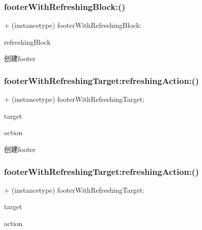 \subsubsection{\texorpdfstring{footer\+With\+Refreshing\+Block\+:()}{footerWithRefreshingBlock:()}\hspace{0.1cm}{\footnotesize\ttfamily [3/3]}}
{\footnotesize\ttfamily + (instancetype) footer\+With\+Refreshing\+Block\+: \begin{DoxyParamCaption}\item[{(M\+J\+Refresh\+Component\+Refreshing\+Block)}]{refreshing\+Block }\end{DoxyParamCaption}}

创建footer \mbox{\label{interface_m_j_refresh_footer_a5cafac545e56be7cad42b8f3919a8d23}} 
\subsubsection{\texorpdfstring{footer\+With\+Refreshing\+Target\+:refreshing\+Action\+:()}{footerWithRefreshingTarget:refreshingAction:()}\hspace{0.1cm}{\footnotesize\ttfamily [1/3]}}
{\footnotesize\ttfamily + (instancetype) footer\+With\+Refreshing\+Target\+: \begin{DoxyParamCaption}\item[{(id)}]{target }\item[{refreshingAction:(S\+EL)}]{action }\end{DoxyParamCaption}}

创建footer \mbox{\label{interface_m_j_refresh_footer_a5cafac545e56be7cad42b8f3919a8d23}} 
\subsubsection{\texorpdfstring{footer\+With\+Refreshing\+Target\+:refreshing\+Action\+:()}{footerWithRefreshingTarget:refreshingAction:()}\hspace{0.1cm}{\footnotesize\ttfamily [2/3]}}
{\footnotesize\ttfamily + (instancetype) footer\+With\+Refreshing\+Target\+: \begin{DoxyParamCaption}\item[{(id)}]{target }\item[{refreshingAction:(S\+EL)}]{action }\end{DoxyParamCaption}}

